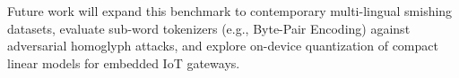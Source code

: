 \documentclass[conference]{IEEEtran}
\begin{document}
Future work will expand this benchmark to contemporary multi-lingual smishing datasets, evaluate sub-word tokenizers (e.g., Byte-Pair Encoding) against adversarial homoglyph attacks, and explore on-device quantization of compact linear models for embedded IoT gateways.



\end{document}
